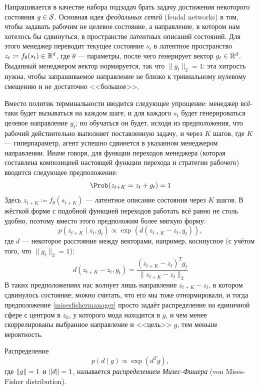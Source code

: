 Напрашивается в качестве набора подзадач брать задачу достижения некоторого состояния $g \in \mathcal{S}$. Основная идея \emph{феодальных сетей} (feudal networks) в том, чтобы задавать рабочим не целевое состояние, а направление, в котором нам хотелось бы сдвинуться, в пространстве латентных описаний состояний. Для этого менеджер переводит текущее состояние $s_t$ в латентное пространство $z_t \coloneqq f_\theta(s_t) \in \mathbb{R}^d$, где $\theta$ --- параметры, после чего генерирует вектор $g_t \in \mathbb{R}^d$. Выданный менеджером вектор нормируется, так что $\|g_t\|_2 = 1$: эта хитрость нужна, чтобы запрашиваемое направление не близко к тривиальному нулевому смещению и не достаточно <<большое>>.

Вместо политик терминальности вводится следующее упрощение: менеджер всё-таки будет вызываться на каждом шаге, и для каждого $s_t$ будет генерироваться целевое направление $g_t$; но обучаться он будет, исходя из предположения, что рабочий действительно выполняет поставленную задачу, и через $K$ шагов, где $K$ --- гиперпараметр, агент успешно сдвинется в указанном менеджером направлении. Иначе говоря, для функции переходов менеджера (которая составлена композицией настоящей функции перехода и стратегии рабочего) вводится следующее предположение:
$$\Prob (z_{t + K} = z_t + g_t) = 1$$
Здесь $z_{t+K} \coloneqq f_{\theta}(s_{t+K})$ --- латентное описание состояния через $K$ шагов. В жёсткой форме с подобной функцией переходов работать всё равно не столь удобно, поэтому вместо этого предположим более мягкую форму:
\begin{equation}\label{misesfishermanager}
    p(z_{t + K} \mid z_t, g_t) \propto \exp(d(z_{t+K} - z_t, g_t)),
\end{equation}
где $d$ --- некоторое расстояние между векторами, например, косинусное (с учётом того, что $\|g_t\|_2 = 1$):
$$d(z_{t+K} - z_t, g_t) = \frac{(z_{t+K} - z_t)^Tg_t}{\|z_{t + K} - z_t\|_2}$$
В таких предположениях нас волнует лишь направление $z_{t + K} - z_t$, в котором сдвинулось состояние; можно считать, что его мы тоже отнормировали, и тогда предположение \eqref{misesfishermanager} просто задаёт распределение на единичной сфере с центром в $z_k$, у которого мода находится в $g$, и чем менее скоррелированы выбранное направление и <<цель>> $g$, тем меньше вероятность.
\begin{definition}
Распределение 
\begin{equation}\label{misesfisher}
   p(d \mid g) \propto \exp(d^Tg),
\end{equation}
где $\|g\| \HM= 1$ и $\|d\| \HM= 1$, называется \emph{распределением Мизес-Фишера} (von Mises-Fisher distribution).
\end{definition}

